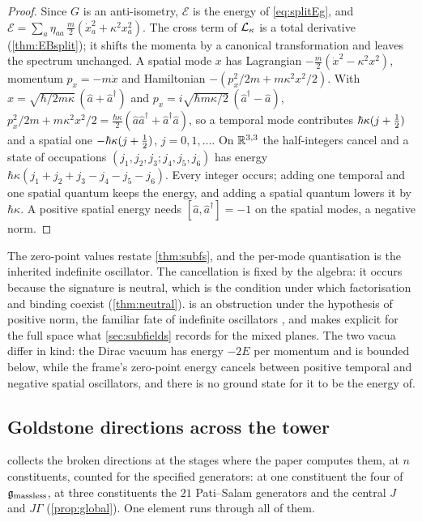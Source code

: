 \begin{proof}
Since $G$ is an anti-isometry, $\mathcal E$ is the energy of \eqref{eq:splitEg}, and
$\mathcal E=\sum_a\eta_{aa}\,\tfrac m2(\dot x_a^2+\kappa^2x_a^2)$. The cross term of $\mathcal L_\kappa$ is a total derivative (\cref{thm:EBsplit}); it
shifts the momenta by a canonical transformation and leaves the spectrum unchanged. A spatial mode $x$ has Lagrangian
$-\tfrac m2(\dot x^2-\kappa^2x^2)$, momentum $p_x=-m\dot x$ and Hamiltonian $-(p_x^2/2m+m\kappa^2x^2/2)$. With
$x=\sqrt{\hbar/2m\kappa}\,(\hat a+\hat a^\dagger)$ and $p_x=i\sqrt{\hbar m\kappa/2}\,(\hat a^\dagger-\hat a)$,
$p_x^2/2m+m\kappa^2x^2/2=\tfrac{\hbar\kappa}2(\hat a\hat a^\dagger+\hat a^\dagger\hat a)$, so a temporal mode contributes $\hbar\kappa(j+\tfrac12)$ and a spatial one
$-\hbar\kappa(j+\tfrac12)$, $j=0,1,\dots$. On $\mathbb{R}^{3,3}$ the half-integers cancel and a state of occupations $(j_1,j_2,j_3;j_4,j_5,j_6)$ has energy
$\hbar\kappa(j_1+j_2+j_3-j_4-j_5-j_6)$. Every integer occurs; adding one temporal and one spatial quantum keeps the energy, and adding a
spatial quantum lowers it by $\hbar\kappa$. A positive spatial energy needs $[\hat a,\hat a^\dagger]=-1$ on the spatial modes, a negative norm.
\end{proof}

The zero-point values restate \cref{thm:subfs}, and the per-mode quantisation is the inherited indefinite oscillator. The cancellation is
fixed by the algebra: it occurs because the signature is neutral, which is the condition under which factorisation and binding coexist
(\cref{thm:neutral}).  is an obstruction under the hypothesis of positive norm, the familiar fate of indefinite
oscillators \cite{PaisUhlenbeck50}, and makes explicit for the full space what \cref{sec:subfields} records for the mixed planes. The two
vacua differ in kind: the Dirac vacuum has energy $-2E$ per momentum and is bounded below, while the frame's zero-point energy cancels
between positive temporal and negative spatial oscillators, and there is no ground state for it to be the energy of.

\subsection{Goldstone directions across the tower}
\label{sec:massgoldstone}

 collects the broken directions at the stages where the paper computes them, at $n$ constituents, counted for the specified generators:
at one constituent the four of $\mathfrak g_{\rm massless}$, at three constituents the $21$ Pati--Salam generators and the central $J$ and
$J\Gamma$ (\cref{prop:global}). One element runs through all of them.

